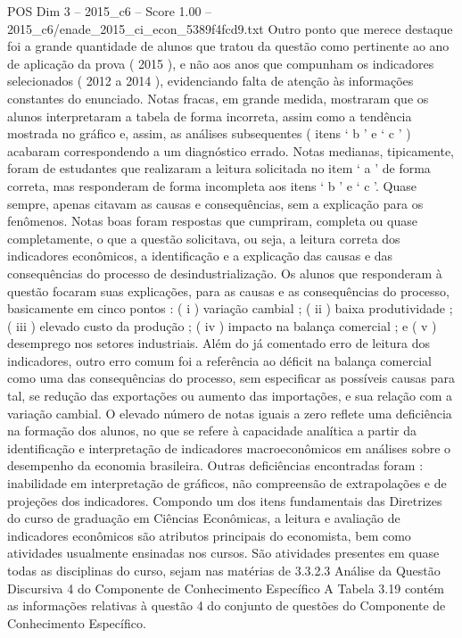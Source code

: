 \begin{textsample}{POS Dim 3 – 2015\_c6 – Score 1.00 – 2015\_c6/enade\_2015\_ci\_econ\_5389f4fcd9.txt}
Outro ponto que merece destaque foi a grande quantidade de alunos que tratou da questão como pertinente ao ano de aplicação da prova ( 2015 ), e não aos anos que compunham os indicadores selecionados ( 2012 a 2014 ), evidenciando falta de atenção às informações constantes do enunciado.
Notas fracas, em grande medida, mostraram que os alunos interpretaram a tabela de forma incorreta, assim como a tendência mostrada no gráfico e, assim, as análises subsequentes ( itens ‘ b ’ e ‘ c ’ ) acabaram correspondendo a um diagnóstico errado.
Notas medianas, tipicamente, foram de estudantes que realizaram a leitura solicitada no item ‘ a ’ de forma correta, mas responderam de forma incompleta aos itens ‘ b ’ e ‘ c ’.
Quase sempre, apenas citavam as causas e consequências, sem a explicação para os fenômenos.
Notas boas foram respostas que cumpriram, completa ou quase completamente, o que a questão solicitava, ou seja, a leitura correta dos indicadores econômicos, a identificação e a explicação das causas e das consequências do processo de desindustrialização.
Os alunos que responderam à questão focaram suas explicações, para as causas e as consequências do processo, basicamente em cinco pontos : ( i ) variação cambial ; ( ii ) baixa produtividade ; ( iii ) elevado custo da produção ; ( iv ) impacto na balança comercial ; e ( v ) desemprego nos setores industriais.
Além do já comentado erro de leitura dos indicadores, outro erro comum foi a referência ao déficit na balança comercial como uma das consequências do processo, sem especificar as possíveis causas para tal, se redução das exportações ou aumento das importações, e sua relação com a variação cambial.
O elevado número de notas iguais a zero reflete uma deficiência na formação dos alunos, no que se refere à capacidade analítica a partir da identificação e interpretação de indicadores macroeconômicos em análises sobre o desempenho da economia brasileira.
Outras deficiências encontradas foram : inabilidade em interpretação de gráficos, não compreensão de extrapolações e de projeções dos indicadores.
Compondo um dos itens fundamentais das Diretrizes do curso de graduação em Ciências Econômicas, a leitura e avaliação de indicadores econômicos são atributos principais do economista, bem como atividades usualmente ensinadas nos cursos.
São atividades presentes em quase todas as disciplinas do curso, sejam nas matérias de 3.3.2.3 Análise da Questão Discursiva 4 do Componente de Conhecimento Específico A Tabela 3.19 contém as informações relativas à questão 4 do conjunto de questões do Componente de Conhecimento Específico.

\end{textsample}
